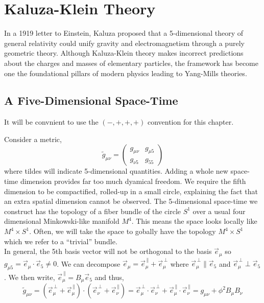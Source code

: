 \documentclass[11pt, a4paper]{article}
\begin{document}
\section{Kaluza-Klein Theory}

In a 1919 letter to Einstein, Kaluza proposed that a 5-dimensional theory of general relativity could unify gravity and electromagnetism through a purely geometric theory. Although Kaluza-Klein theory makes incorrect predictions about the charges and masses of elementary particles, the framework has become one the foundational pillars of modern physics leading to Yang-Mills theories. 

\subsection{A Five-Dimensional Space-Time}
\begin{remark}
It will be convnient to use the $(-, +, +, +)$ convention for this chapter.
\end{remark}
\noindent
Consider a metric,
\[ \tilde{g}_{\mu \nu} = \begin{pmatrix}
g_{\mu \nu} & g_{\mu 5} \\
g_{\nu 5} & g_{55}
\end{pmatrix}\]
where tildes will indicate 5-dimensional quantities. Adding a whole new space-time dimension provides far too much dyamical freedom. We require the fifth dimension to be compactified, rolled-up in a small circle, explaining the fact that an extra spatial dimension cannot be observed. The 5-dimensional space-time we construct has the topology of a fiber bundle of the circle $S^1$ over a usual four dimensional Minkowski-like manifold $M^4$. This means the space looks locally like $M^4 \times S^1$. Often, we will take the space to gobally have the topology $M^4 \times S^1$ which we refer to a ``trivial'' bundle.
\bigskip\\
In general, the 5th basis vector will not be orthogonal to the basis $\vec{e}_\mu$ so $g_{\mu 5} = \vec{e}_\mu \cdot \vec{e}_5 \neq 0$. We can decompose $\vec{e}_\mu = \vec{e}_{\mu}^{\, \parallel} + \vec{e}_\mu^{\, \perp}$ where $\vec{e}_{\mu}^{\, \perp} \parallel \vec{e}_5$ and $\vec{e}_{\mu}^{\, \perp} \perp \vec{e}_5$. We then write, $\vec{e}_{\mu}^{\, \parallel} = B_\mu \vec{e}_5$ and thus,
\[ \tilde{g}_{\mu \nu} =  (\vec{e}_{\mu}^{\, \perp} + \vec{e}_\mu^{\, \parallel}) \cdot (\vec{e}_{\nu}^{\, \perp} + \vec{e}_\nu^{\, \parallel}) = \vec{e}_{\mu}^{\, \perp} \cdot \vec{e}_{\nu}^{\, \perp} + \vec{e}_\mu^{\, \parallel} \cdot \vec{e}_{\nu}^{\, \parallel} = g_{\mu \nu} + \phi^2 B_\mu B_\nu \]
\end{document}
